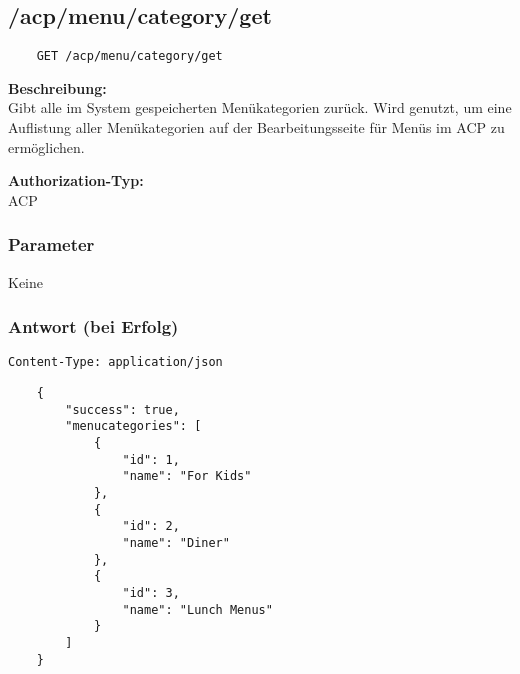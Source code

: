 \subsection{/acp/menu/category/get}

\begin{lstlisting}
    GET /acp/menu/category/get
\end{lstlisting}

\textbf{Beschreibung:} \\
Gibt alle im System gespeicherten Menükategorien zurück. Wird genutzt, um eine Auflistung aller Menükategorien auf der Bearbeitungsseite für Menüs im ACP zu ermöglichen.

\textbf{Authorization-Typ:} \\
ACP

\subsubsection{Parameter}
Keine

\subsubsection{Antwort (bei Erfolg)}

\lstinline{Content-Type: application/json}
\begin{lstlisting}
    {
        "success": true, 
        "menucategories": [
            {
                "id": 1,
                "name": "For Kids"
            },
            {
                "id": 2,
                "name": "Diner"
            },
            {
                "id": 3,
                "name": "Lunch Menus"
            }
        ]
    }
\end{lstlisting}
